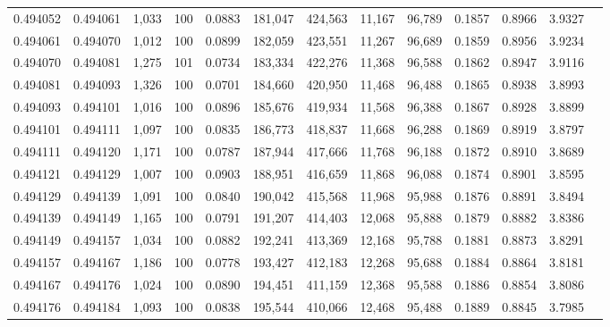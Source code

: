 \begin{tabular}{rrrrrrrrrrrrr}
0.494052 & 0.494061 & 1,033 & 100 &                                     0.0883 & 181,047 & 424,563 &  11,167 &  96,789 & 0.1857 & 0.8966 & 3.9327 \\
0.494061 & 0.494070 & 1,012 & 100 &                                     0.0899 & 182,059 & 423,551 &  11,267 &  96,689 & 0.1859 & 0.8956 & 3.9234 \\
0.494070 & 0.494081 & 1,275 & 101 &                                     0.0734 & 183,334 & 422,276 &  11,368 &  96,588 & 0.1862 & 0.8947 & 3.9116 \\
0.494081 & 0.494093 & 1,326 & 100 &                                     0.0701 & 184,660 & 420,950 &  11,468 &  96,488 & 0.1865 & 0.8938 & 3.8993 \\
0.494093 & 0.494101 & 1,016 & 100 &                                     0.0896 & 185,676 & 419,934 &  11,568 &  96,388 & 0.1867 & 0.8928 & 3.8899 \\
0.494101 & 0.494111 & 1,097 & 100 &                                     0.0835 & 186,773 & 418,837 &  11,668 &  96,288 & 0.1869 & 0.8919 & 3.8797 \\
0.494111 & 0.494120 & 1,171 & 100 &                                     0.0787 & 187,944 & 417,666 &  11,768 &  96,188 & 0.1872 & 0.8910 & 3.8689 \\
0.494121 & 0.494129 & 1,007 & 100 &                                     0.0903 & 188,951 & 416,659 &  11,868 &  96,088 & 0.1874 & 0.8901 & 3.8595 \\
0.494129 & 0.494139 & 1,091 & 100 &                                     0.0840 & 190,042 & 415,568 &  11,968 &  95,988 & 0.1876 & 0.8891 & 3.8494 \\
0.494139 & 0.494149 & 1,165 & 100 &                                     0.0791 & 191,207 & 414,403 &  12,068 &  95,888 & 0.1879 & 0.8882 & 3.8386 \\
0.494149 & 0.494157 & 1,034 & 100 &                                     0.0882 & 192,241 & 413,369 &  12,168 &  95,788 & 0.1881 & 0.8873 & 3.8291 \\
0.494157 & 0.494167 & 1,186 & 100 &                                     0.0778 & 193,427 & 412,183 &  12,268 &  95,688 & 0.1884 & 0.8864 & 3.8181 \\
0.494167 & 0.494176 & 1,024 & 100 &                                     0.0890 & 194,451 & 411,159 &  12,368 &  95,588 & 0.1886 & 0.8854 & 3.8086 \\
0.494176 & 0.494184 & 1,093 & 100 &                                     0.0838 & 195,544 & 410,066 &  12,468 &  95,488 & 0.1889 & 0.8845 & 3.7985 \\

\end{tabular}
